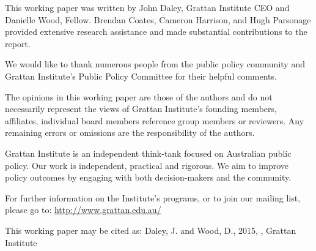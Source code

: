 This working paper was written by John Daley, Grattan Institute CEO and
Danielle Wood, Fellow. Brendan Coates, Cameron Harrison, and Hugh
Parsonage provided extensive research assistance and made substantial
contributions to the report. 

We would like to thank numerous people from the public policy community and
Grattan Institute's Public Policy Committee for their helpful comments.

The opinions in this working paper are those of the authors and do not
necessarily represent the views of Grattan Institute's founding members,
affiliates, individual board members reference group members or reviewers. Any
remaining errors or omissions are the responsibility of the authors.


Grattan Institute is an independent think-tank focused on Australian public
policy. Our work is independent, practical and rigorous. We aim to improve
policy outcomes by engaging with both decision-makers and the community. 

For further information on the Institute's programs, or to join our mailing list,
please go to: \url{http://www.grattan.edu.au/}

{\small
This working paper may be cited as: Daley, J. and Wood, D., 2015, \textit{\mytitle}, Grattan Institute 
}